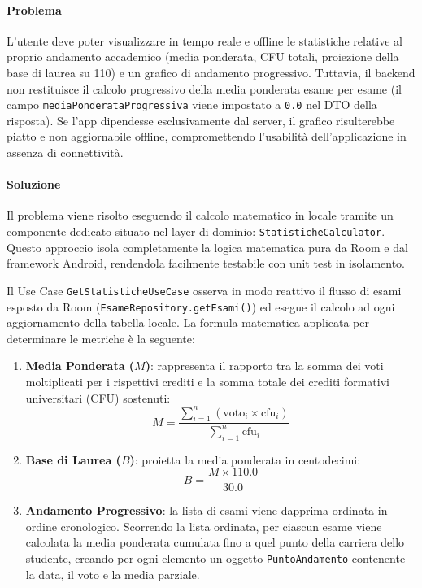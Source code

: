 \documentclass[a4paper,12pt]{report}
\begin{document}
    \paragraph{Problema}
    L'utente deve poter visualizzare in tempo reale e offline le statistiche relative al proprio andamento
    accademico (media ponderata, CFU totali, proiezione della base di laurea su 110) e un grafico di andamento progressivo.
    Tuttavia, il backend non restituisce il calcolo progressivo della media ponderata esame per esame (il campo
    \texttt{mediaPonderataProgressiva} viene impostato a \texttt{0.0} nel DTO della risposta).
    Se l'app dipendesse esclusivamente dal server, il grafico risulterebbe piatto e non aggiornabile offline,
    compromettendo l'usabilità dell'applicazione in assenza di connettività.

    \paragraph{Soluzione}
    Il problema viene risolto eseguendo il calcolo matematico in locale tramite un componente dedicato situato nel layer
    di dominio: \texttt{StatisticheCalculator}. Questo approccio isola completamente la logica matematica pura da Room e
    dal framework Android, rendendola facilmente testabile con unit test in isolamento.

    Il Use Case \texttt{GetStatisticheUseCase} osserva in modo reattivo il flusso di esami esposto da Room
    (\texttt{EsameRepository.getEsami()}) ed esegue il calcolo ad ogni aggiornamento della tabella locale.
    La formula matematica applicata per determinare le metriche è la seguente:
    \begin{enumerate}
        \item \textbf{Media Ponderata ($M$)}: rappresenta il rapporto tra la somma dei voti moltiplicati per i rispettivi crediti e la somma totale dei crediti formativi universitari (CFU) sostenuti:
        \[ M = \frac{\sum_{i=1}^{n} (\text{voto}_i \times \text{cfu}_i)}{\sum_{i=1}^{n} \text{cfu}_i} \]
        \item \textbf{Base di Laurea ($B$)}: proietta la media ponderata in centodecimi:
        \[ B = \frac{M \times 110.0}{30.0} \]
        \item \textbf{Andamento Progressivo}: la lista di esami viene dapprima ordinata in ordine cronologico.
        Scorrendo la lista ordinata, per ciascun esame viene calcolata la media ponderata cumulata fino a quel punto della carriera dello studente,
        creando per ogni elemento un oggetto \texttt{PuntoAndamento} contenente la data, il voto e la media parziale.
    \end{enumerate}
\end{document}
